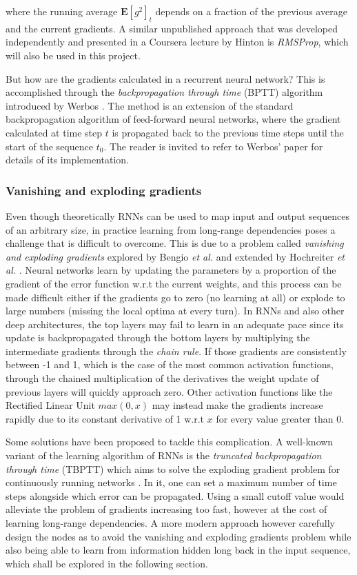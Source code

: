 \documentclass{kththesis}
\begin{document}
where the running average $\mathbf{E}[g^2]_t$ depends on a fraction of the previous average and the current gradients. A similar unpublished approach that was developed independently and presented in a Coursera lecture by Hinton is \emph{RMSProp}\citep{hinton2012rmsprop}, which will also be used in this project. 

But how are the gradients calculated in a recurrent neural network? This is accomplished through the \emph{backpropagation through time} (BPTT) algorithm introduced by Werbos \citep{werbos1990backpropagation}. The method is an extension of the standard backpropagation algorithm of feed-forward neural networks, where the gradient calculated at time step $t$ is propagated back to the previous time steps until the start of the sequence $t_0$. The reader is invited to refer to Werbos' paper for details of its implementation.

\subsubsection{Vanishing and exploding gradients}

Even though theoretically RNNs can be used to map input and output sequences of an arbitrary size, in practice learning from long-range dependencies poses a challenge that is difficult to overcome. This is due to a problem called \emph{vanishing and exploding gradients} explored by Bengio \emph{et al.} \citep{bengio1994learning} and extended by Hochreiter \emph{et al.} \citep{hochreiter2001gradient}. Neural networks learn by updating the parameters by a proportion of the gradient of the error function w.r.t the current weights, and this process can be made difficult either if the gradients go to zero (no learning at all) or explode to large numbers (missing the local optima at every turn). In RNNs and also other deep architectures, the top layers may fail to learn in an adequate pace since its update is backpropagated through the bottom layers by multiplying the intermediate gradients through the \emph{chain rule}. If those gradients are consistently between -1 and 1, which is the case of the most common activation functions, through the chained multiplication of the derivatives the weight update of previous layers will quickly approach zero. Other activation functions like the Rectified Linear Unit $max(0,x)$ may instead make the gradients increase rapidly due to its constant derivative of 1 w.r.t $x$ for every value greater than 0.

Some solutions have been proposed to tackle this complication. A well-known variant of the learning algorithm of RNNs is the \emph{truncated backpropagation through time} (TBPTT) which aims to solve the exploding gradient problem for continuously running networks \citep{williams1989learning}. In it, one can set a maximum number of time steps alongside which error can be propagated. Using a small cutoff value would alleviate the problem of gradients increasing too fast, however at the cost of learning long-range dependencies. A more modern approach however carefully design the nodes as to avoid the vanishing and exploding gradients problem while also being able to learn from information hidden long back in the input sequence, which shall be explored in the following section.
\end{document}
